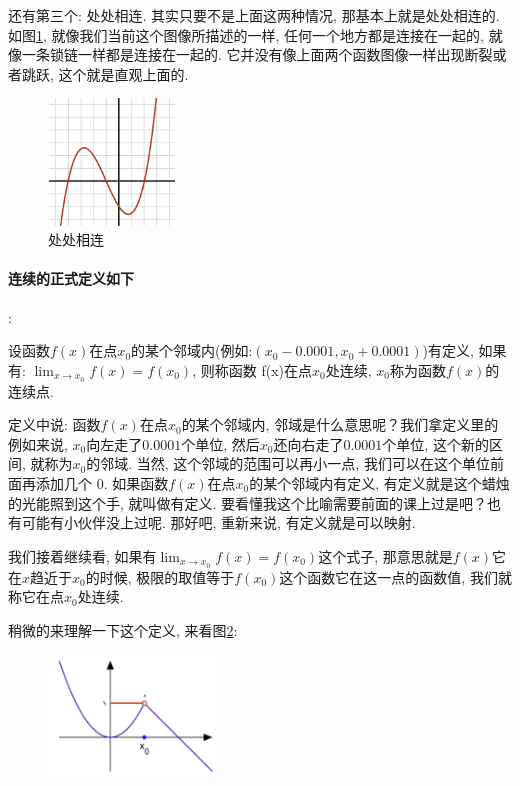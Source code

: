 还有第三个: 处处相连. 其实只要不是上面这两种情况, 那基本上就是处处相连的. 如图\ref{fig:img9_3}, 就像我们当前这个图像所描述的一样, 任何一个地方都是连接在一起的, 就像一条锁链一样都是连接在一起的. 它并没有像上面两个函数图像一样出现断裂或者跳跃, 这个就是直观上面的. 

\begin{figure}[ht]
  \centering
  \includegraphics[width=0.3\textwidth]{asset/a5406854-3b3e-427c-b296-e56f004f1568.png}
  \caption{处处相连}
  \label{fig:img9_3}
\end{figure}

\paragraph{连续的正式定义如下}:

\begin{newquotation}
  设函数$f(x)$在点$x_0$的某个邻域内(例如:$(x_0 - 0.0001, x_0 + 0.0001)$)有定义, 如果有: \(\lim_{x \to x_0}f(x)=f(x_0)\), 则称函数 f(x)在点$x_0$处连续, $x_0$称为函数$f(x)$的连续点. 
\end{newquotation}

定义中说: 函数$f(x)$在点$x_0$的某个邻域内, 邻域是什么意思呢？我们拿定义里的例如来说, $x_0$向左走了$0.0001$个单位, 然后$x_0$还向右走了$0.0001$个单位, 这个新的区间, 就称为$x_0$的邻域. 当然, 这个邻域的范围可以再小一点, 我们可以在这个单位前面再添加几个 0. 如果函数$f(x)$在点$x_0$的某个邻域内有定义, 有定义就是这个蜡烛的光能照到这个手, 就叫做有定义. 要看懂我这个比喻需要前面的课上过是吧？也有可能有小伙伴没上过呢. 那好吧, 重新来说, 有定义就是可以映射. 

我们接着继续看, 如果有$\lim_{x \to x_0}f(x)=f(x_0)$这个式子, 那意思就是$f(x)$它在$x$趋近于$x_0$的时候, 极限的取值等于$f(x_0)$这个函数它在这一点的函数值, 我们就称它在点$x_0$处连续. 

稍微的来理解一下这个定义, 来看图\ref{fig:img9_4}: 

\begin{figure}[ht]
  \centering
  \includegraphics[width=0.4\textwidth]{asset/00036f9b-aad5-4c4e-b1a2-c7a287d93f1d.png}
  \caption{}
  \label{fig:img9_4}
\end{figure}

